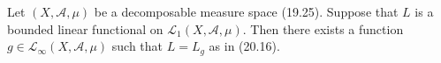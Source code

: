 Let $(X, \mathcal{A}, \mu)$ be a decomposable measure space (19.25). Suppose that $L$ is a bounded linear functional on $\mathcal{L}_1(X, \mathcal{A}, \mu)$. Then there exists a function $g \in \mathcal{L}_\infty(X, \mathcal{A}, \mu)$ such that $L = L_g$ as in (20.16).